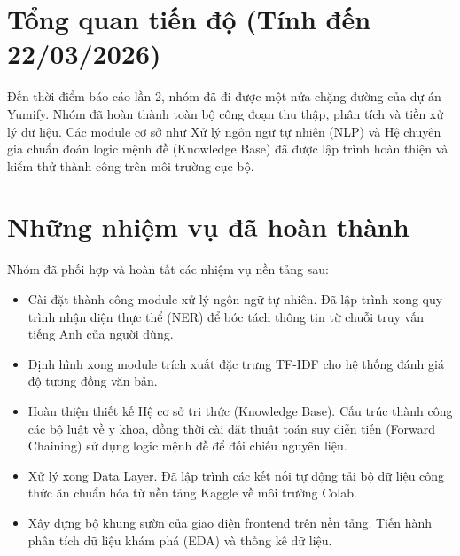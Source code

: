 \documentclass[a4paper, 12pt]{article}
\begin{document}
\newpage


\section{Tổng quan tiến độ (Tính đến 22/03/2026)}
Đến thời điểm báo cáo lần 2, nhóm đã đi được một nửa chặng đường của dự án Yumify. Nhóm đã hoàn thành toàn bộ công đoạn thu thập, phân tích và tiền xử lý dữ liệu. Các module cơ sở như Xử lý ngôn ngữ tự nhiên (NLP) và Hệ chuyên gia chuẩn đoán logic mệnh đề (Knowledge Base) đã được lập trình hoàn thiện và kiểm thử thành công trên môi trường cục bộ.

\section{Những nhiệm vụ đã hoàn thành}
Nhóm đã phối hợp và hoàn tất các nhiệm vụ nền tảng sau:
\begin{itemize}
    \item Cài đặt thành công module xử lý ngôn ngữ tự nhiên. Đã lập trình xong quy trình nhận diện thực thể (NER) để bóc tách thông tin từ chuỗi truy vấn tiếng Anh của người dùng.
    \item Định hình xong module trích xuất đặc trưng TF-IDF cho hệ thống đánh giá độ tương đồng văn bản.
    \item Hoàn thiện thiết kế Hệ cơ sở tri thức (Knowledge Base). Cấu trúc thành công các bộ luật về y khoa, đồng thời cài đặt thuật toán suy diễn tiến (Forward Chaining) sử dụng logic mệnh đề để đối chiếu nguyên liệu.
    \item Xử lý xong Data Layer. Đã lập trình các kết nối tự động tải bộ dữ liệu công thức ăn chuẩn hóa từ nền tảng Kaggle về môi trường Colab.
    \item Xây dựng bộ khung sườn của giao diện frontend trên nền tảng. Tiến hành phân tích dữ liệu khám phá (EDA) và thống kê dữ liệu.
\end{itemize}
\end{document}
